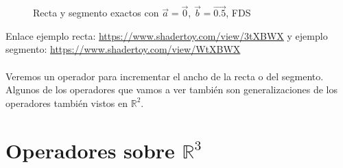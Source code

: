 \begin{figure}[H]
  \centering
  \captionsetup{justification=centering}%
  \hfill
  \caption{Recta y segmento exactos con \(\Vec{a}=\Vec{0}\), \(\Vec{b}=\Vec{0.5}\), FDS}
  \label{fig:rectasegmento3d}
\end{figure}
Enlace ejemplo recta: \url{https://www.shadertoy.com/view/3tXBWX} y ejemplo segmento:
\url{https://www.shadertoy.com/view/WtXBWX}\\\\
Veremos un operador para incrementar el ancho de la recta o del segmento. Algunos de los operadores que vamos a ver también son generalizaciones de los operadores también  vistos en \(\mathbb{R}^2\).

\section{Operadores sobre \(\mathbb{R}^3\)}

